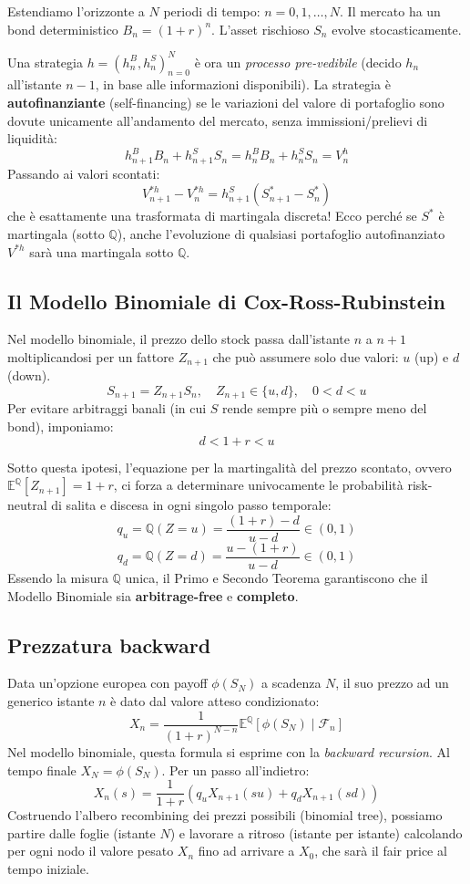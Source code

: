 \documentclass[11pt, a4paper]{report}
\theoremstyle{plain}
\theoremstyle{definition}
\theoremstyle{remark}
\newcommand{\E}{\mathbb{E}}
\newcommand{\QQ}{\mathbb{Q}}
\newcommand{\1}{\mathbf{1}}
\begin{document}
Estendiamo l'orizzonte a $N$ periodi di tempo: $n=0, 1, \dots, N$. Il mercato ha un bond deterministico $B_n = (1+r)^n$. L'asset rischioso $S_n$ evolve stocasticamente.

Una strategia $h = (h_n^B, h_n^S)_{n=0}^{N}$ è ora un \emph{processo pre-vedibile} (decido $h_n$ all'istante $n-1$, in base alle informazioni disponibili). La strategia è \textbf{autofinanziante} (self-financing) se le variazioni del valore di portafoglio sono dovute unicamente all'andamento del mercato, senza immissioni/prelievi di liquidità:
\[ h_{n+1}^B B_n + h_{n+1}^S S_n = h_n^B B_n + h_n^S S_n = V_n^h \]
Passando ai valori scontati:
\[ V_{n+1}^{*h} - V_{n}^{*h} = h_{n+1}^S (S_{n+1}^* - S_n^*) \]
che è esattamente una trasformata di martingala discreta! Ecco perché se $S^*$ è martingala (sotto $\QQ$), anche l'evoluzione di qualsiasi portafoglio autofinanziato $V^{*h}$ sarà una martingala sotto $\QQ$.

\subsection{Il Modello Binomiale di Cox-Ross-Rubinstein}
Nel modello binomiale, il prezzo dello stock passa dall'istante $n$ a $n+1$ moltiplicandosi per un fattore $Z_{n+1}$ che può assumere solo due valori: $u$ (up) e $d$ (down).
\[ S_{n+1} = Z_{n+1} S_n, \quad Z_{n+1} \in \{u, d\}, \quad 0 < d < u \]
Per evitare arbitraggi banali (in cui $S$ rende sempre più o sempre meno del bond), imponiamo:
\[ d < 1+r < u \]

Sotto questa ipotesi, l'equazione per la martingalità del prezzo scontato, ovvero $\E^\QQ[Z_{n+1}] = 1+r$, ci forza a determinare univocamente le probabilità risk-neutral di salita e discesa in ogni singolo passo temporale:
\[ q_u = \QQ(Z = u) = \frac{(1+r) - d}{u - d} \in (0, 1) \]
\[ q_d = \QQ(Z = d) = \frac{u - (1+r)}{u - d} \in (0, 1) \]
Essendo la misura $\QQ$ unica, il Primo e Secondo Teorema garantiscono che il Modello Binomiale sia \textbf{arbitrage-free} e \textbf{completo}.

\subsection{Prezzatura backward}
Data un'opzione europea con payoff $\phi(S_N)$ a scadenza $N$, il suo prezzo ad un generico istante $n$ è dato dal valore atteso condizionato:
\[ X_n = \frac{1}{(1+r)^{N-n}} \E^\QQ[\phi(S_N) \mid \mathcal{F}_n] \]
Nel modello binomiale, questa formula si esprime con la \emph{backward recursion}. Al tempo finale $X_N = \phi(S_N)$. Per un passo all'indietro:
\[ X_n(s) = \frac{1}{1+r} \left( q_u X_{n+1}(su) + q_d X_{n+1}(sd) \right) \]
Costruendo l'albero recombining dei prezzi possibili (binomial tree), possiamo partire dalle foglie (istante $N$) e lavorare a ritroso (istante per istante) calcolando per ogni nodo il valore pesato $X_n$ fino ad arrivare a $X_0$, che sarà il fair price al tempo iniziale.
\end{document}
